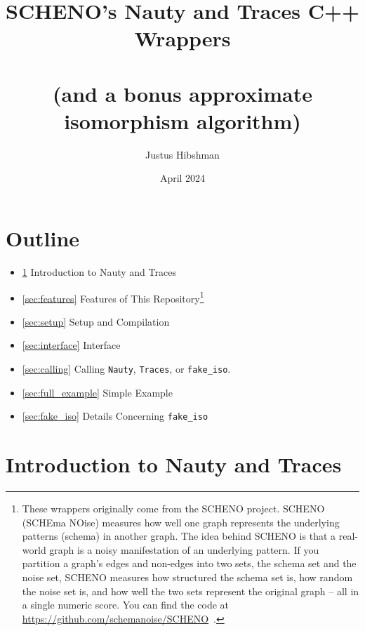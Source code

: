 \documentclass{article}
\begin{document}
\title{SCHENO's Nauty and Traces C++ Wrappers\\\ \\(and a bonus approximate isomorphism algorithm)}

\author{Justus Hibshman}

\date{April 2024}

\maketitle

\vspace{2cm}

\section*{Outline}

\begin{itemize}
    \item \ref{sec:nt_intro} Introduction to Nauty and Traces
    \item \ref{sec:features} Features of This Repository\footnote{These wrappers originally come from the SCHENO project. SCHENO (SCHEma NOise) measures how well one graph represents the underlying patterns (schema) in another graph. The idea behind SCHENO is that a real-world graph is a noisy manifestation of an underlying pattern. If you partition a graph's edges and non-edges into two sets, the schema set and the noise set, SCHENO measures how structured the schema set is, how random the noise set is, and how well the two sets represent the original graph -- all in a single numeric score. You can find the code at \url{https://github.com/schemanoise/SCHENO}\ .}
    \item \ref{sec:setup} Setup and Compilation
    \item \ref{sec:interface} Interface
    \item \ref{sec:calling} Calling \verb|Nauty|, \verb|Traces|, or \verb|fake_iso|.
    \item \ref{sec:full_example} Simple Example
    \item \ref{sec:fake_iso} Details Concerning \verb|fake_iso|
\end{itemize}


\newpage

\section{Introduction to Nauty and Traces}\label{sec:nt_intro}
\end{document}
